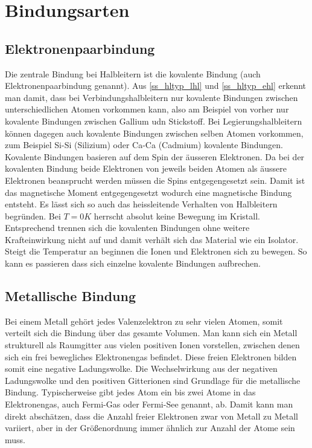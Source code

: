 \section{Bindungsarten}
	\subsection{Elektronenpaarbindung}
	Die zentrale Bindung bei Halbleitern ist die kovalente Bindung (auch Elektronenpaarbindung genannt). Aus \ref{ss_hltyp_lhl} und \ref{ss_hltyp_ehl} erkennt man damit, dass bei Verbindungshalbleitern nur kovalente Bindungen zwischen unterschiedlichen Atomen vorkommen kann, also am Beispiel von vorher nur kovalente Bindungen zwischen Gallium udn Stickstoff. Bei Legierungshalbleitern können dagegen auch kovalente Bindungen zwischen selben Atomen vorkommen, zum Beispiel Si-Si (Silizium) oder Ca-Ca (Cadmium) kovalente Bindungen.
	Kovalente Bindungen basieren auf dem Spin der äusseren Elektronen. Da bei der kovalenten Bindung beide Elektronen von jeweils beiden Atomen als äussere Elektronen beansprucht werden müssen die Spins entgegengesetzt sein. Damit ist das magnetische Moment entgegengesetzt wodurch eine magnetische Bindung entsteht. Es lässt sich so auch das heissleitende Verhalten von Halbleitern begründen. Bei $T=0K$ herrscht absolut keine Bewegung im Kristall. Entsprechend trennen sich die kovalenten Bindungen ohne weitere Krafteinwirkung nicht auf und damit verhält sich das Material wie ein Isolator. Steigt die Temperatur an beginnen die Ionen und Elektronen sich zu bewegen. So kann es passieren dass sich einzelne kovalente Bindungen aufbrechen.
	\subsection{Metallische Bindung}
	Bei einem Metall gehört jedes Valenzelektron zu sehr vielen Atomen, somit verteilt sich die Bindung über das gesamte Volumen. Man kann sich ein Metall strukturell als Raumgitter aus vielen positiven Ionen vorstellen, zwischen denen sich ein frei bewegliches Elektronengas befindet. Diese freien Elektronen bilden somit eine negative Ladungswolke. Die Wechselwirkung aus der negativen Ladungswolke und den positiven Gitterionen sind Grundlage für die metallische Bindung. Typischerweise gibt jedes Atom ein bis zwei Atome in das Elektronengas, auch Fermi-Gas oder Fermi-See genannt, ab. Damit kann man direkt abschätzen, dass die Anzahl freier Elektronen zwar von Metall zu Metall variiert, aber in der Größenordnung immer ähnlich zur Anzahl der Atome sein muss.
